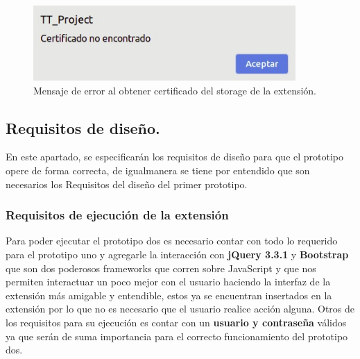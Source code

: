 \documentclass[12pt, a4paper, titlepage]{report}
\begin{document}
    			\begin{figure}[H]
    				\begin{center}	\includegraphics[width=10cm]{./imagenes/Desarrollo/Prototipo_2/UI_certNotFound.jpeg}
    					\caption[Mensaje de error en certificado]{Mensaje de error al obtener certificado del storage de la extensión.}
    				\end{center}
    			\end{figure}
    			\label{UI_certNotFound}
			
    	    \subsection{Requisitos de diseño.}
    			   En este apartado, se especificarán los requisitos de diseño para que el prototipo opere de forma correcta, de igualmanera se tiene por entendido que son necesarios los Requisitos del diseño del primer prototipo.
    			   \subsubsection{Requisitos de ejecución de la extensi\'on}
    			        Para poder ejecutar el prototipo dos es necesario contar con todo lo requerido para el prototipo uno y agregarle la interacci\'on con \textbf{jQuery 3.3.1 } y \textbf{Bootstrap} que son dos poderosos frameworks que corren sobre JavaScript y que nos permiten interactuar un poco mejor con el usuario haciendo la interfaz de la extensi\'on más amigable y entendible, estos ya se encuentran insertados en la extensión por lo que no es necesario que el usuario realice acción alguna.
    			        Otros de los requisitos para su ejecución es contar con un \textbf{usuario y contraseña} válidos ya que ser\'an de suma importancia para el correcto funcionamiento del prototipo dos.
\end{document}
